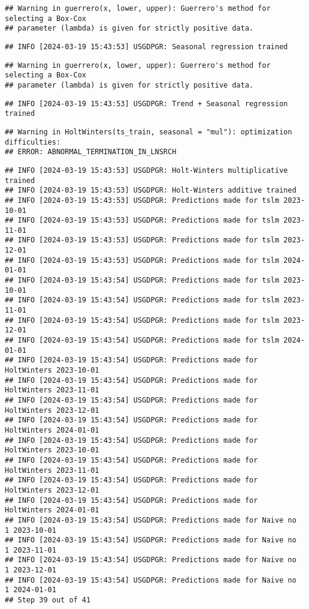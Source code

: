 \documentclass[
]{article}
\begin{document}
\begin{verbatim}
## Warning in guerrero(x, lower, upper): Guerrero's method for selecting a Box-Cox
## parameter (lambda) is given for strictly positive data.
\end{verbatim}

\begin{verbatim}
## INFO [2024-03-19 15:43:53] USGDPGR: Seasonal regression trained
\end{verbatim}

\begin{verbatim}
## Warning in guerrero(x, lower, upper): Guerrero's method for selecting a Box-Cox
## parameter (lambda) is given for strictly positive data.
\end{verbatim}

\begin{verbatim}
## INFO [2024-03-19 15:43:53] USGDPGR: Trend + Seasonal regression trained
\end{verbatim}

\begin{verbatim}
## Warning in HoltWinters(ts_train, seasonal = "mul"): optimization difficulties:
## ERROR: ABNORMAL_TERMINATION_IN_LNSRCH
\end{verbatim}

\begin{verbatim}
## INFO [2024-03-19 15:43:53] USGDPGR: Holt-Winters multiplicative trained
## INFO [2024-03-19 15:43:53] USGDPGR: Holt-Winters additive trained
## INFO [2024-03-19 15:43:53] USGDPGR: Predictions made for tslm 2023-10-01
## INFO [2024-03-19 15:43:53] USGDPGR: Predictions made for tslm 2023-11-01
## INFO [2024-03-19 15:43:53] USGDPGR: Predictions made for tslm 2023-12-01
## INFO [2024-03-19 15:43:53] USGDPGR: Predictions made for tslm 2024-01-01
## INFO [2024-03-19 15:43:54] USGDPGR: Predictions made for tslm 2023-10-01
## INFO [2024-03-19 15:43:54] USGDPGR: Predictions made for tslm 2023-11-01
## INFO [2024-03-19 15:43:54] USGDPGR: Predictions made for tslm 2023-12-01
## INFO [2024-03-19 15:43:54] USGDPGR: Predictions made for tslm 2024-01-01
## INFO [2024-03-19 15:43:54] USGDPGR: Predictions made for HoltWinters 2023-10-01
## INFO [2024-03-19 15:43:54] USGDPGR: Predictions made for HoltWinters 2023-11-01
## INFO [2024-03-19 15:43:54] USGDPGR: Predictions made for HoltWinters 2023-12-01
## INFO [2024-03-19 15:43:54] USGDPGR: Predictions made for HoltWinters 2024-01-01
## INFO [2024-03-19 15:43:54] USGDPGR: Predictions made for HoltWinters 2023-10-01
## INFO [2024-03-19 15:43:54] USGDPGR: Predictions made for HoltWinters 2023-11-01
## INFO [2024-03-19 15:43:54] USGDPGR: Predictions made for HoltWinters 2023-12-01
## INFO [2024-03-19 15:43:54] USGDPGR: Predictions made for HoltWinters 2024-01-01
## INFO [2024-03-19 15:43:54] USGDPGR: Predictions made for Naive no  1 2023-10-01
## INFO [2024-03-19 15:43:54] USGDPGR: Predictions made for Naive no  1 2023-11-01
## INFO [2024-03-19 15:43:54] USGDPGR: Predictions made for Naive no  1 2023-12-01
## INFO [2024-03-19 15:43:54] USGDPGR: Predictions made for Naive no  1 2024-01-01
## Step 39 out of 41
\end{verbatim}
\end{document}
